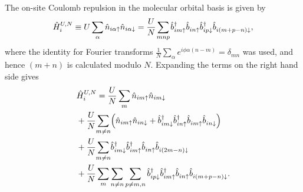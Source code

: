 \documentclass[reprint,aps,prb,amsmath,amssymb]{revtex4-2}
\begin{document}
The on-site Coulomb repulsion in the molecular orbital basis is given by
%
\begin{equation}
\hat{H}_i^{U,N} \equiv U \sum_{\alpha} \hat{n}_{i\alpha \uparrow} \hat{n}_{i\alpha \downarrow} = \frac{U}{N} \sum_{ \mathclap{m n p} } \hat{b}_{im \uparrow}^{\dagger} \hat{b}_{in \uparrow}^{} \hat{b}_{ip \downarrow}^{\dagger} \hat{b}_{i(m + p - n) \downarrow}^{},
\end{equation}
%
where the identity for Fourier transforms $\frac{1}{N} \sum_{\alpha} e^{i\phi \alpha(n-m)} = \delta_{mn}$ was used, and hence $(m + n)$ is calculated modulo $N$. Expanding the terms on the right hand side gives
%
\begin{align} \label{eq:app-hubb-u-1}
& \hat{H}_i^{U,N} = \frac{U}{N} \sum_m \hat{n}_{im\uparrow} \hat{n} _{im\downarrow} \nonumber \\
%
& + \frac{U}{N} \sum_{ \mathclap{m\neq n} } \left( \hat{n}_{im\uparrow} \hat{n}_{in \downarrow} + \hat{b}_{im \downarrow}^{\dagger} \hat{b}_{in \uparrow}^{\dagger} \hat{b}_{im\uparrow}^{} \hat{b}_{in \downarrow}^{} \right) \nonumber \\
%
& + \frac{U}{N} \sum_{ \mathclap{m \neq n} } \hat{b}_{im\downarrow}^{\dagger} \hat{b}_{im\uparrow}^{\dagger} \hat{b}_{in\uparrow}^{} \hat{b}_{i(2m-n) \downarrow}^{} \nonumber \\
%
& + \frac{U}{N} \sum_m \sum_{n \neq n} \sum_{p \neq m,n}  \hat{b}_{i p \downarrow}^{\dagger} \hat{b}_{i m\uparrow}^{\dagger} \hat{b}_{i n \uparrow}^{} \hat{b}_{i (m + p -n) \downarrow}^{}.
\end{align}
\end{document}

